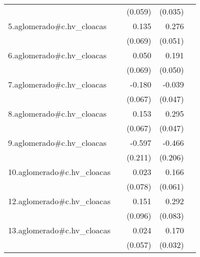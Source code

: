 {\begin{longtable}{l*{4}{D{.}{.}{-1}}}
            &                     &     (0.059)         &     (0.035)         &                     \\
\addlinespace
5.aglomerado#c.hv\_cloacas&                     &       0.135         &       0.276\sym{***}&                     \\
            &                     &     (0.069)         &     (0.051)         &                     \\
\addlinespace
6.aglomerado#c.hv\_cloacas&                     &       0.050         &       0.191\sym{***}&                     \\
            &                     &     (0.069)         &     (0.050)         &                     \\
\addlinespace
7.aglomerado#c.hv\_cloacas&                     &      -0.180\sym{**} &      -0.039         &                     \\
            &                     &     (0.067)         &     (0.047)         &                     \\
\addlinespace
8.aglomerado#c.hv\_cloacas&                     &       0.153\sym{*}  &       0.295\sym{***}&                     \\
            &                     &     (0.067)         &     (0.047)         &                     \\
\addlinespace
9.aglomerado#c.hv\_cloacas&                     &      -0.597\sym{**} &      -0.466\sym{*}  &                     \\
            &                     &     (0.211)         &     (0.206)         &                     \\
\addlinespace
10.aglomerado#c.hv\_cloacas&                     &       0.023         &       0.166\sym{**} &                     \\
            &                     &     (0.078)         &     (0.061)         &                     \\
\addlinespace
12.aglomerado#c.hv\_cloacas&                     &       0.151         &       0.292\sym{***}&                     \\
            &                     &     (0.096)         &     (0.083)         &                     \\
\addlinespace
13.aglomerado#c.hv\_cloacas&                     &       0.024         &       0.170\sym{***}&                     \\
            &                     &     (0.057)         &     (0.032)         &                     \\

\end{longtable}}
